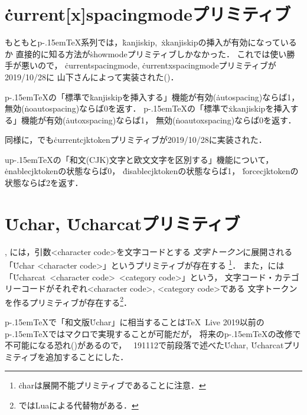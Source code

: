 \documentclass[a4paper,11pt,nomag]{jsarticle}
\def\upTeX{u\pTeX}\def\pTeX{p\kern-.15em\TeX}
\begin{document}
\section{\.{current[x]spacingmode}プリミティブ}
もともと\pTeX 系列では，\.{kanjiskip},~\.{xkanjiskip}の挿入が有効になっているか
直接的に知る方法が\.{showmode}プリミティブしかなかった．
これでは使い勝手が悪いので，
\.{currentspacingmode}, \.{currentxspacingmode}プリミティブが2019/10/28に
山下さんによって実装された(\cite{tjb94})．

\begin{cslist}
  \pTeX の「標準で\.{kanjiskip}を挿入する」機能が有効(\.{autospacing})ならば1，
  無効(\.{noautospacing})ならば0を返す．
  \pTeX の「標準で\.{xkanjiskip}を挿入する」機能が有効(\.{autoxspacing})ならば1，
  無効(\.{noautoxspacing})ならば0を返す．
\end{cslist}

同様に，\eupTeX でも\.{currentcjktoken}プリミティブが2019/10/28に実装された．

\begin{cslist}
  \upTeX の「和文(CJK)文字と欧文文字を区別する」機能について，
  \.{enablecjktoken}の状態ならば0，
  \.{disablecjktoken}の状態ならば1，
  \.{forcecjktoken}の状態ならば2を返す．
\end{cslist}


\section{\.{Uchar}, \.{Ucharcat}プリミティブ}
, には，引数<character code>を文字コードとする
\emph{文字トークン}に展開される「\.{Uchar} <character code>」というプリミティブが存在する
\footnote{\.{char}は展開不能プリミティブであることに注意．}．
また，には「\.{Ucharcat}~<character code>~<category code>」という，
文字コード・カテゴリーコードがそれぞれ<character code>, <category code>である
文字トークンを作るプリミティブが存在する\footnote{ではLuaによる代替物がある．}．

\pTeX で「和文版\.{Uchar}」に相当することは\TeX~Live 2019以前の\pTeX ではマクロで実現することが可能だが，
将来の\pTeX の改修で不可能になる恐れ(\cite{tjb81,tjb95})があるので，
\epTeX~191112で前段落で述べた\.{Uchar}, \.{Ucharcat}プリミティブを追加することにした．
\end{document}
